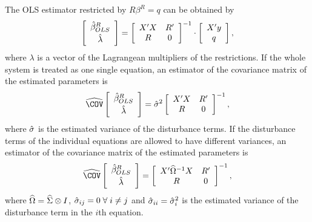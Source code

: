 The OLS estimator restricted by $R \beta^R = q$ can be obtained by
\begin{equation}
   \left[ \begin{array}{c}
      \hat{\beta}^R_{OLS} \\[0.2em] \hat{\lambda}
   \end{array} \right]
   =
   \left[ \begin{array}{cc}
      X' X & R' \\ 
      R & 0
   \end{array} \right]^{-1}
   \cdot
   \left[ \begin{array}{c}
      X' y \\ q 
   \end{array} \right] ,
\end{equation}
where $\lambda$ is a vector of the Lagrangean multipliers of the restrictions.
If the whole system is treated as one single equation,
an estimator of the covariance matrix of the estimated parameters is
\begin{equation}
   \COVHat
   \left[ \begin{array}{c}
      \bHat^R_{OLS} \\[0.2em] \lHat
   \end{array} \right] 
   = \sHat^2 
   \left[ \begin{array}{cc}
      X' X & R' \\ 
      R & 0
   \end{array} \right]^{-1} ,
\end{equation}
where $\hat{\sigma}$ is the estimated variance of the disturbance terms.
If the disturbance terms of the individual equations
are allowed to have different variances, 
an estimator of the covariance matrix of the estimated parameters is
\begin{equation}
   \COVHat
   \left[ \begin{array}{c}
      \bHat^R_{OLS} \\[0.2em] \lHat
   \end{array} \right] 
   = 
   \left[ \begin{array}{cc}
      X' \OHat^{-1} X & R' \\
      R & 0
   \end{array} \right]^{-1} ,
\end{equation}
where $\widehat{\Omega} = \widehat{\Sigma} \otimes I$,
$\hat{\sigma}_{ij} = 0 \; \forall \; i \neq j$ and
$\hat{\sigma}_{ii} = \hat{\sigma}_i^2$ is the estimated variance
of the disturbance term in the $i$th equation.

